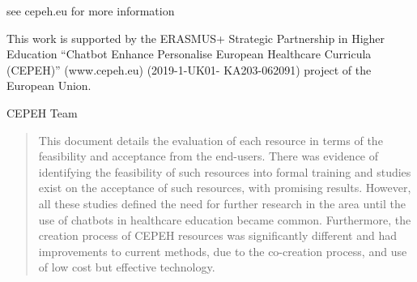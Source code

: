 \documentclass[a4paper, nobind]{templates/ociamthesis}
\begin{document}

\begin{romanpages}

\maketitle

\begin{dedication}
  see cepeh.eu for more information
\end{dedication}



\begin{acknowledgements}
 	This work is supported by the ERASMUS+ Strategic Partnership in Higher Education ``Chatbot Enhance Personalise European Healthcare Curricula (CEPEH)'' (www.cepeh.eu) (2019-1-UK01- KA203-062091) project of the European Union.

 \begin{flushright}
 CEPEH Team \\
 \end{flushright}
\end{acknowledgements}





\renewcommand{\abstracttitle}{Abstract}
\begin{abstract}
	This document details the evaluation of each resource in terms of the feasibility and acceptance from the end-users. There was evidence of identifying the feasibility of such resources into formal training and studies exist on the acceptance of such resources, with promising results. However, all these studies defined the need for further research in the area until the use of chatbots in healthcare education became common. Furthermore, the creation process of CEPEH resources was significantly different and had improvements to current methods, due to the co-creation process, and use of low cost but effective technology.
\end{abstract}



\dominitoc %


\end{romanpages}
\end{document}
